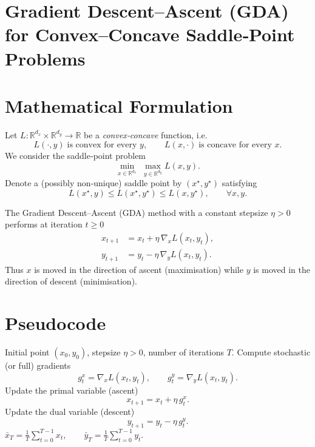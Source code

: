 \documentclass{article}
\begin{document}
\section*{Gradient Descent–Ascent (GDA) for Convex–Concave Saddle‑Point Problems}

\section*{Mathematical Formulation}
Let $L:\mathbb{R}^{d_x}\times\mathbb{R}^{d_y}\rightarrow\mathbb{R}$ be a \emph{convex‑concave} function, i.e.
\[
L(\cdot ,y)\;\text{is convex for every }y,\qquad 
L(x,\cdot )\;\text{is concave for every }x .
\]
We consider the saddle‑point problem
\[
\min_{x\in\mathbb{R}^{d_x}}\;\max_{y\in\mathbb{R}^{d_y}} L(x,y).
\]
Denote a (possibly non‑unique) saddle point by $(x^{\star},y^{\star})$ satisfying
\[
L(x^{\star},y)\le L(x^{\star},y^{\star})\le L(x,y^{\star}),\qquad \forall x,y.
\]

The Gradient Descent–Ascent (GDA) method with a constant stepsize $\eta>0$ performs at iteration $t\ge 0$
\begin{align}
x_{t+1} &= x_t + \eta \,\nabla_{x}L(x_t,y_t),\label{eq:xupdate}\\
y_{t+1} &= y_t - \eta \,\nabla_{y}L(x_t,y_t).\label{eq:yupdate}
\end{align}
Thus $x$ is moved in the direction of ascent (maximisation) while $y$ is moved in the direction of descent (minimisation).  

\section*{Pseudocode}
\begin{algorithm}[H]
\caption{Gradient Descent–Ascent (GDA)}\label{alg:gda}
\begin{algorithmic}[1]
\REQUIRE Initial point $(x_0,y_0)$, stepsize $\eta>0$, number of iterations $T$.
    \STATE Compute stochastic (or full) gradients 
    \[
    g^x_t=\nabla_x L(x_t,y_t),\qquad 
    g^y_t=\nabla_y L(x_t,y_t).
    \]
    \STATE Update the primal variable (ascent)
    \[
    x_{t+1}=x_t+\eta\, g^x_t .
    \]
    \STATE Update the dual variable (descent)
    \[
    y_{t+1}=y_t-\eta\, g^y_t .
    \]
\ENDFOR
\RETURN $\displaystyle \bar{x}_T=\frac1T\sum_{t=0}^{T-1}x_t,\qquad 
\bar{y}_T=\frac1T\sum_{t=0}^{T-1}y_t$.
\end{algorithmic}
\end{algorithm}
\end{document}
